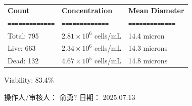 \documentclass[UTF8,10pt,a4paper,fontset=fandol]{ctexart}
\newcommand{\fieldvalue}[1]{#1}
\newcommand{\handwritten}[1]{#1}
\begin{document}
\begin{tabularx}{\textwidth}{@{}>{\raggedright\arraybackslash}X
>{\raggedright\arraybackslash}X
>{\raggedright\arraybackslash}X@{}}
\textbf{Count} & \textbf{Concentration} & \textbf{Mean Diameter} \\
\texttt{=============} & \texttt{=============} & \texttt{=============} \\

Total:
\fieldvalue{795}
&
\fieldvalue{$2.81{\times}10^{6}$ cells/mL}
&
\fieldvalue{14.4 micron}
\\

Live:
\fieldvalue{663}
&
\fieldvalue{$2.34{\times}10^{6}$ cells/mL}
&
\fieldvalue{14.3 microns}
\\

Dead:
\fieldvalue{132}
&
\fieldvalue{$4.67{\times}10^{5}$ cells/mL}
&
\fieldvalue{14.8 microns}
\\
\end{tabularx}

\medskip
\noindent Viability:
\fieldvalue{83.4\%}

\medskip
\begin{center}
\hfill
{}

\vspace{0.02\textheight}

\hfill
{}
\end{center}

\vfill

\noindent 操作人/审核人：
\fieldvalue{\handwritten{俞勇?}}
\hfill
日期：
\fieldvalue{\handwritten{2025.07.13}}
\end{document}
